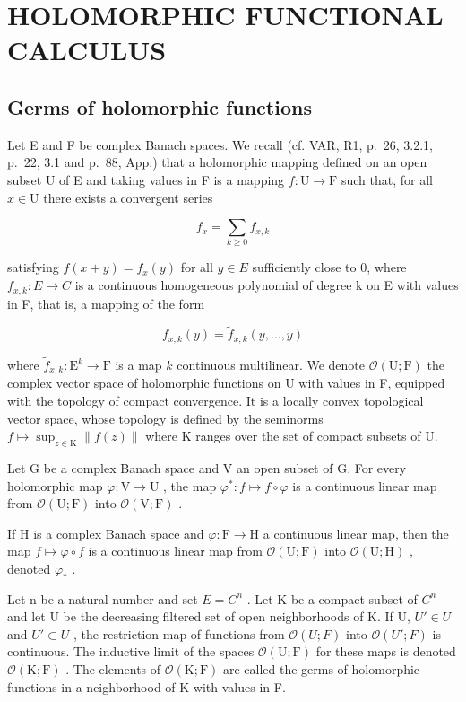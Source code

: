\section{HOLOMORPHIC FUNCTIONAL CALCULUS}

\subsection{Germs of holomorphic functions}

Let E and F be complex Banach spaces. We recall (cf. VAR, R1, p.~26, 3.2.1, p.~22, 3.1 and p.~88, App.) that a holomorphic mapping defined on an open subset U of E and taking values in F is a mapping \(f \colon \mathrm{U} \to \mathrm{F}\) such that, for all \(x \in \mathrm{U}\) there exists a convergent series

\[
f _ {x} = \sum_ {k \geqslant 0} f _ {x, k}
\]

satisfying \(f(x + y) = f_x(y)\) for all \(y \in E\) sufficiently close to 0, where \(f_{x,k} \colon E \to C\) is a continuous homogeneous polynomial of degree k on E with values in F, that is, a mapping of the form

\[
f _ {x, k} (y) = \widetilde {f} _ {x, k} (y, \ldots , y)
\]

where \(\widetilde{f}_{x,k}\colon\mathrm{E}^{k}\to\mathrm{F}\) is a map \(k\) continuous multilinear. We denote \(\mathcal{O}(\mathrm{U};\mathrm{F})\) the complex vector space of holomorphic functions on U with values in F, equipped with the topology of compact convergence. It is a locally convex topological vector space, whose topology is defined by the seminorms \(f\mapsto\sup_{z\in\mathrm{K}}\|f(z)\|\) where K ranges over the set of compact subsets of U.

Let G be a complex Banach space and V an open subset of G. For every holomorphic map \(\varphi\colon\mathrm{V}\to\mathrm{U}\) , the map \(\varphi^{*}\colon f\mapsto f\circ\varphi\) is a continuous linear map from \(\mathcal{O}(\mathrm{U};\mathrm{F})\) into \(\mathcal{O}(\mathrm{V};\mathrm{F})\) .

If H is a complex Banach space and \(\varphi\colon\mathrm{F}\to\mathrm{H}\) a continuous linear map, then the map \(f\mapsto\varphi\circ f\) is a continuous linear map from \(\mathcal{O}(\mathrm{U};\mathrm{F})\) into \(\mathcal{O}(\mathrm{U};\mathrm{H})\) , denoted \(\varphi_{*}\) .

Let n be a natural number and set \(E = C^{n}\) . Let K be a compact subset of \(C^{n}\) and let U be the decreasing filtered set of open neighborhoods of K. If U, \(U' \in U\) and \(U' \subset U\) , the restriction map of functions from \(\mathcal{O}(U; F)\) into \(\mathcal{O}(U'; F)\) is continuous. The inductive limit of the spaces \(\mathcal{O}(\mathrm{U};\mathrm{F})\) for these maps is denoted \(\mathcal{O}(\mathrm{K};\mathrm{F})\) . The elements of \(\mathcal{O}(\mathrm{K};\mathrm{F})\) are called the germs of holomorphic functions in a neighborhood of K with values in F.

